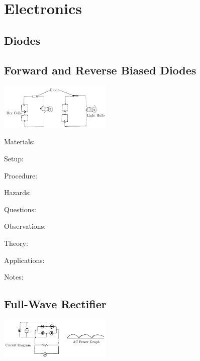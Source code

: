 \section{Electronics}

\begin{multicols}{2}


\section*{Diodes}


\subsection{Forward and Reverse Biased Diodes}

\begin{center}
\includegraphics[width=0.4\textwidth]{./img/diode.png}
\end{center}

\begin{description*}
\item[Materials:]{}
\item[Setup:]{}
\item[Procedure:]{}
\item[Hazards:]{}
\item[Questions:]{}
\item[Observations:]{}
\item[Theory:]{}
\item[Applications:]{}
\item[Notes:]{}
\end{description*}

\subsection{Full-Wave Rectifier}

\begin{center}
\includegraphics[width=0.4\textwidth]{./img/full-wave-rectifier.png}
\end{center}


\end{multicols}
